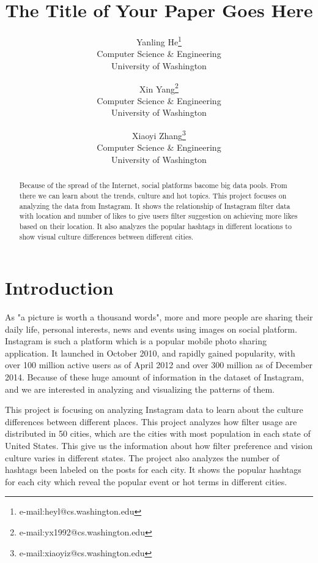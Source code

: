 \documentclass[conference]{acmsiggraph}
\title{The Title of Your Paper Goes Here}
\author{Yanling He\thanks{e-mail:heyl@cs.washington.edu}\\Computer Science \& Engineering\\University of Washington
\and
Xin Yang\thanks{e-mail:yx1992@cs.washington.edu}\\Computer Science \& Engineering\\University of Washington
\and
Xiaoyi Zhang\thanks{e-mail:xiaoyiz@cs.washington.edu}\\Computer Science \& Engineering\\University of Washington
}
\begin{document}

\maketitle

\begin{abstract}

Because of the spread of the Internet, social platforms bacome big data pools. From there we can learn about the trends, culture and hot topics.  This project focuses on analyzing the data from Instagram. It shows the relationship of Instagram filter data with location and number of likes to give users filter suggestion on achieving more likes based on their location. It also analyzes the popular hashtags in different locations to show visual culture differences between different cities. 

\end{abstract}

\keywordlist


\TOGlinkslist


\copyrightspace

\section{Introduction}

As "a picture is worth a thousand words", more and more people are sharing their daily life, personal interests, news and events using images on social platform. Instagram is such a platform which is a popular mobile photo sharing application. It launched in October 2010, and rapidly gained popularity, with over 100 million active users as of April 2012 and over 300 million as of December 2014. Because of these huge amount of information in the dataset of Instagram, and we are interested in analyzing and visualizing the patterns of them. 

This project is focusing on analyzing Instagram data to learn about the culture differences between different places. This project analyzes how filter usage are distributed in 50 cities, which are the cities with most population in each state of United States. This give us the information about how filter preference and vision culture varies in different states. The project also analyzes the number of hashtags been labeled on the posts for each city. It shows the popular hashtags for each city which reveal the popular event or hot terms in different cities.
\end{document}
